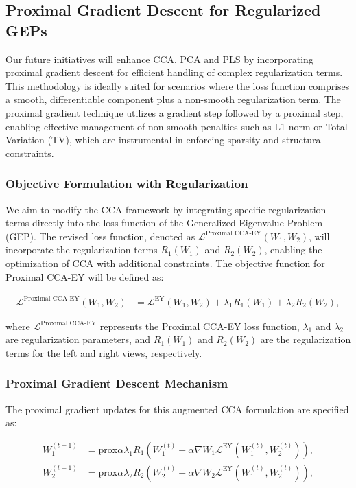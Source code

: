 \subsection{Proximal Gradient Descent for Regularized GEPs}

Our future initiatives will enhance CCA, PCA and PLS by incorporating proximal gradient descent for efficient handling of complex regularization terms. This methodology is ideally suited for scenarios where the loss function comprises a smooth, differentiable component plus a non-smooth regularization term. The proximal gradient technique utilizes a gradient step followed by a proximal step, enabling effective management of non-smooth penalties such as L1-norm or Total Variation (TV), which are instrumental in enforcing sparsity and structural constraints.

\subsubsection{Objective Formulation with Regularization}

We aim to modify the CCA framework by integrating specific regularization terms directly into the loss function of the Generalized Eigenvalue Problem (GEP). The revised loss function, denoted as $\mathcal{L}^{\text{Proximal CCA-EY}}(W_1, W_2)$, will incorporate the regularization terms $R_1(W_1)$ and $R_2(W_2)$, enabling the optimization of CCA with additional constraints. The objective function for Proximal CCA-EY will be defined as:

\begin{align*}
    \mathcal{L}^{\text{Proximal CCA-EY}}(W_1, W_2) &= \mathcal{L}^{\text{EY}}(W_1, W_2)
    + \lambda_1 R_1(W_1) + \lambda_2 R_2(W_2),
    \end{align*}

where $\mathcal{L}^{\text{Proximal CCA-EY}}$ represents the Proximal CCA-EY loss function, $\lambda_1$ and $\lambda_2$ are regularization parameters, and $R_1(W_1)$ and $R_2(W_2)$ are the regularization terms for the left and right views, respectively.

\subsubsection{Proximal Gradient Descent Mechanism}

The proximal gradient updates for this augmented CCA formulation are specified as:

\begin{align}
W_1^{(t+1)} &= \text{prox}{\alpha \lambda_1 R_1}(W_1^{(t)} - \alpha \nabla{W_1} \mathcal{L}^{\text{EY}}(W_1^{(t)}, W_2^{(t)})), \\
W_2^{(t+1)} &= \text{prox}{\alpha \lambda_2 R_2}(W_2^{(t)} - \alpha \nabla{W_2} \mathcal{L}^{\text{EY}}(W_1^{(t)}, W_2^{(t)})),
\end{align}

